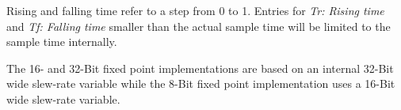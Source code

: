 Rising and falling time refer to a step from 0 to 1.
Entries for \textit{Tr: Rising time} and \textit{Tf: Falling time} smaller than the actual sample time will be limited to the sample time internally.

The 16- and 32-Bit fixed point implementations are based on an internal 32-Bit wide slew-rate variable while the 8-Bit fixed point implementation uses a 16-Bit wide slew-rate variable. 



